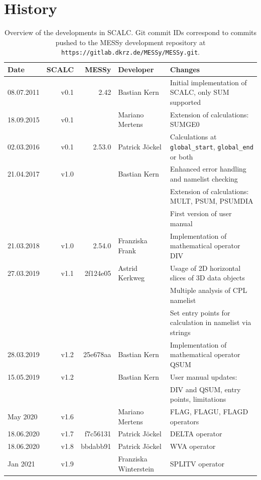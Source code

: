 \documentclass[twoside]{article}
\begin{document}
\section{History}
\begin{table}[h!]
  \begin{tabular}{ l r r l l }
    Date       & SCALC & MESSy   & Developer          & Changes\\
    \hline
    08.07.2011 & v0.1 & 2.42     & Bastian Kern       & Initial implementation of SCALC, only SUM supported\\
    18.09.2015 & v0.1 &          & Mariano Mertens    & Extension of calculations: SUMGE0 \\
    02.03.2016 & v0.1 & 2.53.0   & Patrick J\"{o}ckel & Calculations at \texttt{global\_start}, \texttt{global\_end} or both\\
    21.04.2017 & v1.0 &          & Bastian Kern       & Enhanced error handling and namelist checking\\
               &      &          &                    & Extension of calculations: MULT, PSUM, PSUMDIA\\
               &      &          &                    & First version of user manual\\
    21.03.2018 & v1.0 & 2.54.0   & Franziska Frank    & Implementation of mathematical operator DIV\\
    27.03.2019 & v1.1 & 2f124e05 & Astrid Kerkweg     & Usage of 2D horizontal slices of 3D data objects\\
               &      &          &                    & Multiple analysis of CPL namelist \\
               &      &          &                    & Set entry points for calculation in namelist via strings\\
    28.03.2019 & v1.2 & 25e678aa & Bastian Kern       & Implementation of mathematical operator QSUM\\
    15.05.2019 & v1.2 &          & Bastian Kern       & User manual updates:\\
               &      &          &                    & DIV and QSUM, entry points, limitations\\
    May 2020   & v1.6 &          & Mariano Mertens    & FLAG, FLAGU, FLAGD operators\\
    18.06.2020 & v1.7 & f7c56131 & Patrick J\"{o}ckel & DELTA operator\\
    18.06.2020 & v1.8 & bbdabb91 & Patrick J\"{o}ckel & WVA operator\\
    Jan 2021   & v1.9 &          & Franziska Winterstein & SPLITV operator\\
    \hline
  \end{tabular}
   \caption{Overview of the developments in SCALC. Git commit IDs correspond to commits pushed to the MESSy development repository at {\tt https://gitlab.dkrz.de/MESSy/MESSy.git}.}
   \label{tab:versions}
\end{table}
\end{document}
